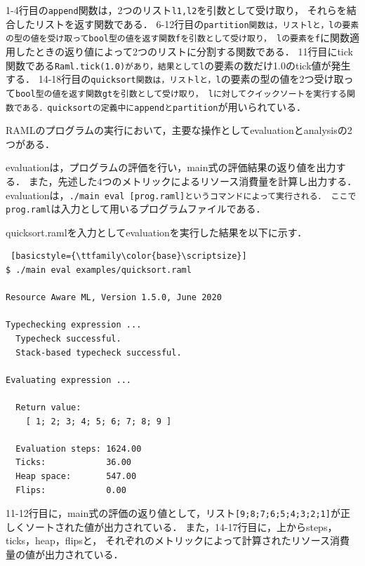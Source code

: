 \documentclass{kuisthesis}
\begin{document}
1-4行目の{\tt append}関数は，2つのリスト{\tt l1,l2}を引数として受け取り，
それらを結合したリストを返す関数である．
6-12行目の{\tt partition関数は，リストlと，lの要素の型の値を受け取ってbool型の値を返す関数fを引数として受け取り，
lの要素をf}に関数適用したときの返り値によって2つのリストに分割する関数である．
11行目にtick関数である{\tt Raml.tick(1.0)があり，結果としてl}の要素の数だけ1.0のtick値が発生する．
14-18行目の{\tt quicksort関数は，リストlと，l}の要素の型の値を2つ受け取って{\tt bool型の値を返す関数gtを引数として受け取り，
lに対してクイックソートを実行する関数である．quicksortの定義中にappendとpartition}が用いられている．

RAMLのプログラムの実行において，主要な操作としてevaluationとanalysisの2つがある．

evaluationは，プログラムの評価を行い，main式の評価結果の返り値を出力する．
また，先述した4つのメトリックによるリソース消費量を計算し出力する．
evaluationは，{\tt ./main eval [prog.raml]というコマンドによって実行される．
ここでprog.raml}は入力として用いるプログラムファイルである．

quicksort.ramlを入力としてevaluationを実行した結果を以下に示す．

\begin{lstlisting} [basicstyle={\ttfamily\color{base}\scriptsize}]
$ ./main eval examples/quicksort.raml

Resource Aware ML, Version 1.5.0, June 2020

Typechecking expression ...
  Typecheck successful.
  Stack-based typecheck successful.

Evaluating expression ...

  Return value:
    [ 1; 2; 3; 4; 5; 6; 7; 8; 9 ]

  Evaluation steps: 1624.00
  Ticks:            36.00
  Heap space:       547.00
  Flips:            0.00

\end{lstlisting}

11-12行目に，main式の評価の返り値として，リスト{\tt [9;8;7;6;5;4;3;2;1]}が正しくソートされた値が出力されている．
また，14-17行目に，上からsteps，ticks，heap，flipsと，
それぞれのメトリックによって計算されたリソース消費量の値が出力されている．
\end{document}
